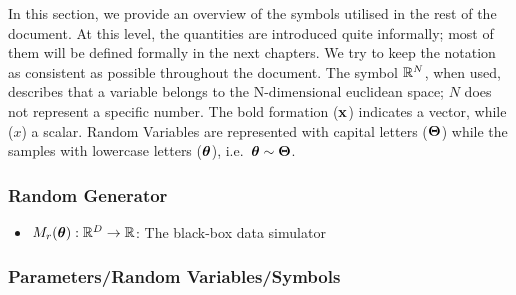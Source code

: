 In this section, we provide an overview of the symbols utilised in the
rest of the document. At this level, the quantities are introduced
quite informally; most of them will be defined formally in the next
chapters. We try to keep the notation as consistent as possible
throughout the document. The symbol $\mathbb{R}^N$, when used, describes that
a variable belongs to the $\text{N-dimensional}$ euclidean space; $N$
does not represent a specific number. The bold formation ($\mathbf{x}$)
indicates a vector, while ($x$) a scalar. Random Variables are
represented with capital letters ($\mathbf{\Theta}$) while the samples with
lowercase letters ($\boldsymbol{\theta}$), i.e.\ $\boldsymbol{\theta} \sim \mathbf{\Theta}$.

\subsubsection*{Random Generator}
\label{sec:random-generator}
\begin{itemize}
\item $M_r(\boldsymbol{\theta}): \mathbb{R}^D \rightarrow \mathbb{R}$: The black-box data simulator
\end{itemize}

\subsubsection*{Parameters/Random Variables/Symbols}
\label{sec:variables}

